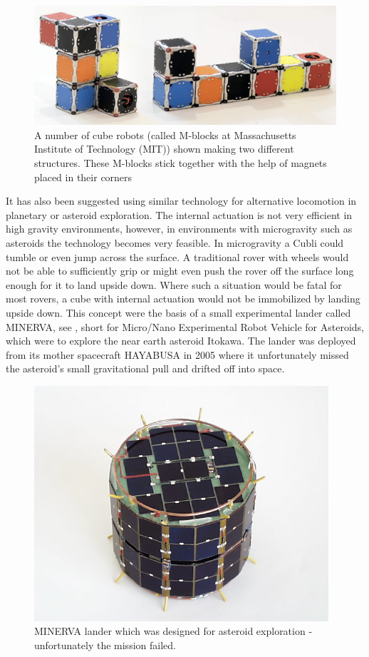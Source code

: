 %
\begin{figure}[H] 
	\centering
	\includegraphics[scale=0.4]{figures/m-blocks}
	\caption{A number of cube robots (called M-blocks at Massachusetts Institute of Technology (MIT)) shown making two different structures. These M-blocks stick together with the help of magnets placed in their corners\cite{LRosen}}
	\label{MBlocksExample}
\end{figure}
%
It has also been suggested using similar technology for alternative locomotion in planetary or asteroid exploration. The internal actuation is not very efficient in high gravity environments, however, in environments with microgravity such as asteroids the technology becomes very feasible. In microgravity a Cubli could tumble or even jump across the surface. A traditional rover with wheels would not be able to sufficiently grip or might even push the rover off the surface long enough for it to land upside down. Where such a situation would be fatal for most rovers, a cube with internal actuation would not be immobilized by landing upside down.
This concept were the basis of a small experimental lander called MINERVA, see , short for Micro/Nano Experimental Robot Vehicle for Asteroids, which were to explore the near earth asteroid Itokawa. The lander was deployed from its mother spacecraft HAYABUSA in 2005 where it unfortunately missed the asteroid's small gravitational pull and drifted off into space.
%
\begin{figure}[H] 
	\centering
	\includegraphics[scale=.5]{figures/MINERVA}
	\caption{MINERVA lander which was designed for asteroid exploration - unfortunately the mission failed.}
	\label{MINERVA}
\end{figure}
